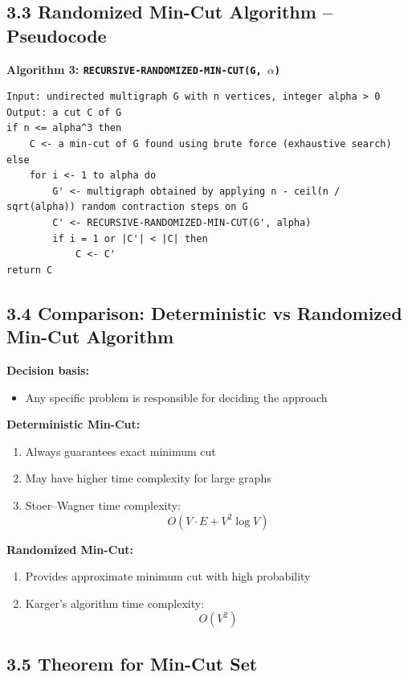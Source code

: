 \documentclass[11pt]{article}
\begin{document}
\subsection*{3.3 Randomized Min-Cut Algorithm – Pseudocode}

\textbf{Algorithm 3: \texttt{RECURSIVE-RANDOMIZED-MIN-CUT(G, \(\alpha\))}}
\begin{verbatim}
Input: undirected multigraph G with n vertices, integer alpha > 0
Output: a cut C of G
if n <= alpha^3 then
    C <- a min-cut of G found using brute force (exhaustive search)
else
    for i <- 1 to alpha do
        G' <- multigraph obtained by applying n - ceil(n / sqrt(alpha)) random contraction steps on G
        C' <- RECURSIVE-RANDOMIZED-MIN-CUT(G', alpha)
        if i = 1 or |C'| < |C| then
            C <- C'
return C
\end{verbatim}

\subsection*{3.4 Comparison: Deterministic vs Randomized Min-Cut Algorithm}

\textbf{Decision basis:}
\begin{itemize}
    \item Any specific problem is responsible for deciding the approach
\end{itemize}

\textbf{Deterministic Min-Cut:}
\begin{enumerate}
    \item Always guarantees exact minimum cut
    \item May have higher time complexity for large graphs
    \item Stoer–Wagner time complexity:
    \[
    O(V \cdot E + V^2 \log V)
    \]
\end{enumerate}

\textbf{Randomized Min-Cut:}
\begin{enumerate}
    \item Provides approximate minimum cut with high probability
    \item Karger’s algorithm time complexity:
    \[
    O(V^2)
    \]
\end{enumerate}

\subsection*{3.5 Theorem for Min-Cut Set}
\end{document}
